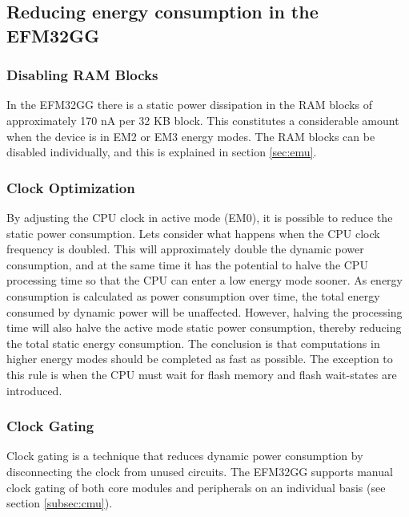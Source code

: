 %


\subsection{Reducing energy consumption in the EFM32GG}

\subsubsection{Disabling RAM Blocks}
In the EFM32GG there is a static power dissipation in the RAM blocks of approximately 170 nA per 32 KB block. This constitutes a considerable amount when the device is in EM2 or EM3 energy modes. The RAM blocks can be disabled individually, and this is explained in section \ref{sec:emu}.\cite{efm32-energy-optimization}

\subsubsection{Clock Optimization}
By adjusting the CPU clock in active mode (EM0), it is possible to reduce the static power consumption. Lets consider what happens when the CPU clock frequency is doubled. This will approximately double the dynamic power consumption, and at the same time it has the potential to halve the CPU processing time so that the CPU can enter a low energy mode sooner. As energy consumption is calculated as power consumption over time, the total energy consumed by dynamic power will be unaffected. However, halving the processing time will also halve the active mode static power consumption, thereby reducing the total static energy consumption. The conclusion is that computations in higher energy modes should be completed as fast as possible. The exception to this rule is when the CPU must wait for flash memory and flash wait-states are introduced.\cite{efm32-energy-optimization}

\subsubsection{Clock Gating}
Clock gating is a technique that reduces dynamic power consumption by disconnecting the clock from unused circuits. The EFM32GG supports manual clock gating of both core modules and peripherals on an individual basis (see section \ref{subsec:cmu}).\cite{efm32-energy-optimization} 


